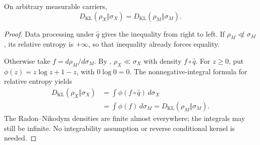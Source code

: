 \begin{theorem}
\label{thm:input-relative-entropy}
On arbitrary measurable carriers,
\[
 D_{\mathrm{KL}}(\rho_X\Vert\sigma_X)
 =D_{\mathrm{KL}}(\rho_M\Vert\sigma_M).
\]
\end{theorem}
\begin{proof}
Data processing under $\widehat q$ gives the inequality from right
to left. If $\rho_M\not\ll\sigma_M$, its relative entropy is
$+\infty$, so that inequality already forces equality.

Otherwise take $f=d\rho_M/d\sigma_M$.
By , $\rho_X\ll\sigma_X$ with density
$f\circ\widehat q$. For $z\ge0$, put
$\phi(z)=z\log z+1-z$, with $0\log0=0$.
The nonnegative-integral formula for relative entropy yields
\[
 \begin{aligned}
 D_{\mathrm{KL}}(\rho_X\Vert\sigma_X)
 &=\int\phi(f\circ\widehat q)\,d\sigma_X\\
 &=\int\phi(f)\,d\sigma_M
 =D_{\mathrm{KL}}(\rho_M\Vert\sigma_M).
 \end{aligned}
\]
The Radon--Nikodym densities are finite almost everywhere; the
integrals may still be infinite. No integrability assumption or
reverse conditional kernel is needed.
\end{proof}
